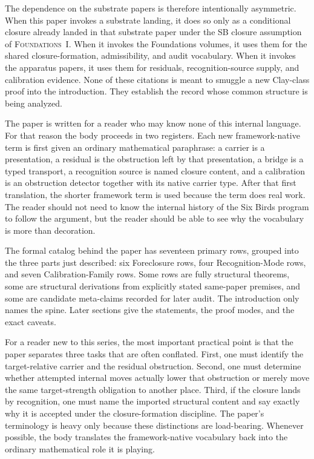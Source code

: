\documentclass[11pt]{article}
\newcommand{\FOne}{\textsc{Foundations~I}}
\theoremstyle{definition}
\begin{document}
The dependence on the substrate papers is therefore intentionally
asymmetric.  When this paper invokes a substrate landing, it does so
only as a conditional closure already landed in that substrate paper
under the SB closure assumption of \FOne.  When it invokes the
Foundations volumes, it uses them for the shared closure-formation,
admissibility, and audit vocabulary.  When it invokes the apparatus
papers, it uses them for residuals, recognition-source supply, and
calibration evidence.  None of these citations is meant to smuggle a
new Clay-class proof into the introduction.  They establish the record
whose common structure is being analyzed.

The paper is written for a reader who may know none of this internal
language.  For that reason the body proceeds in two registers.  Each
new framework-native term is first given an ordinary mathematical
paraphrase: a carrier is a presentation, a residual is the obstruction
left by that presentation, a bridge is a typed transport, a
recognition source is named closure content, and a calibration is an
obstruction detector together with its native carrier type.  After
that first translation, the shorter framework term is used because the
term does real work.  The reader should not need to know the internal
history of the Six Birds program to follow the argument, but the
reader should be able to see why the vocabulary is more than
decoration.

The formal catalog behind the paper has seventeen primary rows,
grouped into the three parts just described: six Foreclosure rows,
four Recognition-Mode rows, and seven Calibration-Family rows.  Some
rows are fully structural theorems, some are structural derivations
from explicitly stated same-paper premises, and some are candidate
meta-claims recorded for later audit.  The introduction only names
the spine.  Later sections give the statements, the proof modes, and
the exact caveats.

For a reader new to this series, the most important practical point is
that the paper separates three tasks that are often conflated.  First,
one must identify the target-relative carrier and the residual
obstruction.  Second, one must determine whether attempted internal
moves actually lower that obstruction or merely move the same
target-strength obligation to another place.  Third, if the closure
lands by recognition, one must name the imported structural content
and say exactly why it is accepted under the closure-formation
discipline.  The paper's terminology is heavy only because these
distinctions are load-bearing.  Whenever possible, the body translates
the framework-native vocabulary back into the ordinary mathematical
role it is playing.
\end{document}

